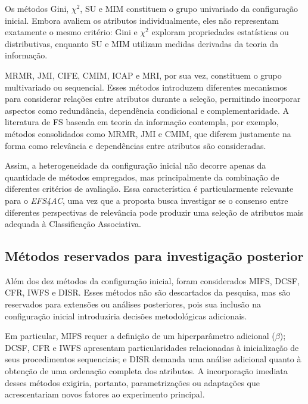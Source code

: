 Os métodos Gini, $\chi^2$, SU e MIM constituem o grupo univariado da
configuração inicial. Embora avaliem os atributos individualmente, eles não
representam exatamente o mesmo critério: Gini e $\chi^2$ exploram propriedades
estatísticas ou distributivas, enquanto SU e MIM utilizam medidas derivadas da
teoria da informação.

MRMR, JMI, CIFE, CMIM, ICAP e MRI, por sua vez, constituem o grupo
multivariado ou sequencial. Esses métodos introduzem diferentes mecanismos para
considerar relações entre atributos durante a seleção, permitindo incorporar
aspectos como redundância, dependência condicional e complementaridade. A
literatura de FS baseada em teoria da informação contempla, por exemplo,
métodos consolidados como MRMR, JMI e CMIM, que diferem justamente na forma
como relevância e dependências entre atributos são consideradas.

Assim, a heterogeneidade da configuração inicial não decorre apenas da
quantidade de métodos empregados, mas principalmente da combinação de
diferentes critérios de avaliação. Essa característica é particularmente
relevante para o \textit{EFS4AC}, uma vez que a proposta busca investigar se
o consenso entre diferentes perspectivas de relevância pode produzir uma
seleção de atributos mais adequada à Classificação Associativa.


\subsection{Métodos reservados para investigação posterior}
\label{subsec:ac-efs-metodos-posteriores}

Além dos dez métodos da configuração inicial, foram considerados MIFS, DCSF,
CFR, IWFS e DISR. Esses métodos não são descartados da pesquisa, mas são
reservados para extensões ou análises posteriores, pois sua inclusão na
configuração inicial introduziria decisões metodológicas adicionais.

Em particular, MIFS requer a definição de um hiperparâmetro adicional
($\beta$); DCSF, CFR e IWFS apresentam particularidades relacionadas à
inicialização de seus procedimentos sequenciais; e DISR demanda uma análise
adicional quanto à obtenção de uma ordenação completa dos atributos. A
incorporação imediata desses métodos exigiria, portanto, parametrizações ou
adaptações que acrescentariam novos fatores ao experimento principal.

